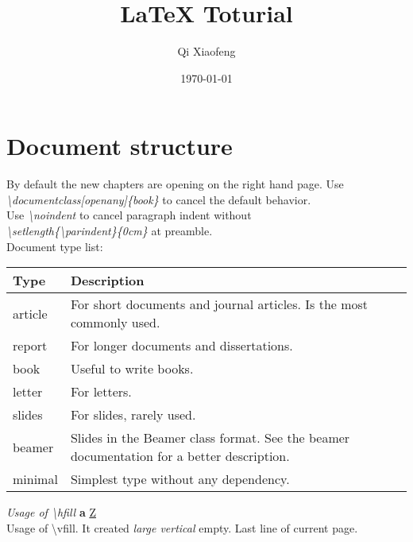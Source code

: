 \documentclass[openany]{book}
\title{LaTeX Toturial}
\author{Qi Xiaofeng}
\date{\today}
\begin{document}

\chapter{Document structure}
By default the new chapters are opening on the right hand page. Use \textit{\scriptsize\textbackslash{}documentclass[openany]\{book\}} to cancel the default behavior.\\
Use {\footnotesize\textit{\textbackslash{noindent}}} to cancel paragraph indent without\\ {\scriptsize\textit{\textbackslash{setlength\{\textbackslash{parindent}\}\{0cm\}}}} at preamble.\\

Document type list:
\begin{center}
\begin{tabular}{|l|m{6cm}|} \hline
\textbf{Type} & \textbf{Description} \\\hline
article & For short documents and journal articles. Is the most commonly used. \\\hline
report & For longer documents and dissertations. \\\hline
book & Useful to write books. \\\hline
letter & For letters. \\\hline
slides & For slides, rarely used. \\\hline
beamer & Slides in the Beamer class format. See the beamer documentation for a better description. \\\hline
minimal & Simplest type without any dependency. \\\hline
\end{tabular}
\end{center}

\textit{Usage of \textbackslash{hfill}} \hfill \textbf{a} \hfill \underline{Z}\\
Usage of \textbackslash{vfill}. It created \emph{large vertical} empty.
\vfill
Last line of current page.%
\end{document}

